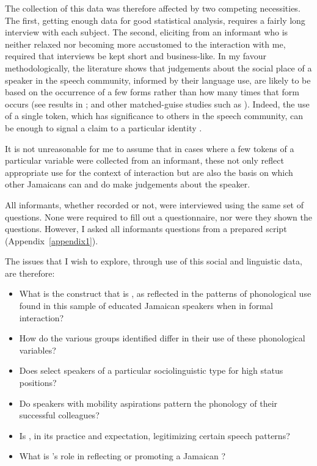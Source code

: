   The collection of this data was therefore affected by two competing necessities.  The first, getting enough data for good statistical analysis, requires a fairly long interview with each subject.  The second, eliciting  from an informant who is neither relaxed nor becoming more accustomed to the interaction with me, required that interviews be kept short and business-like.  In my favour methodologically, the literature shows that judgements about the social place of a speaker in the speech community, informed by their language use, are likely to be based on the occurrence of a few forms rather than how many times that form occurs (see results in \citealt[57]{GraffLabovHarris1986}; and other matched-guise studies such as \citealt{DyerBeckford2001}).  Indeed, the use of a single token, which has significance to others in the speech community, can be enough to signal a claim to a particular identity \citep[167]{Bell2001}.  

It is not unreasonable for me to assume that in cases where a few tokens of a particular variable were collected from an informant, these not only reflect appropriate use for the context of interaction but are also the basis on which other Jamaicans can and do make judgements about the speaker.   

All informants, whether recorded or not, were interviewed using the same set of questions. None were required to fill out a questionnaire, nor were they shown the questions.  However, I asked all informants questions from a prepared script (Appendix~\ref{appendix1}). 

The issues that I wish to explore, through use of this social and linguistic data, are therefore:

\begin{itemize}
\item What is the construct that is , as reflected in the patterns of phonological use found in this sample of educated Jamaican speakers when in formal interaction?
\item How do the various groups identified differ in their use of these phonological variables?
\item Does  select speakers of a particular sociolinguistic type for high status positions?
\item Do speakers with mobility aspirations pattern the phonology of their successful colleagues?
\item Is , in its practice and expectation, legitimizing certain speech patterns?
\item What is ’s role in reflecting or promoting a Jamaican ?
\end{itemize}

